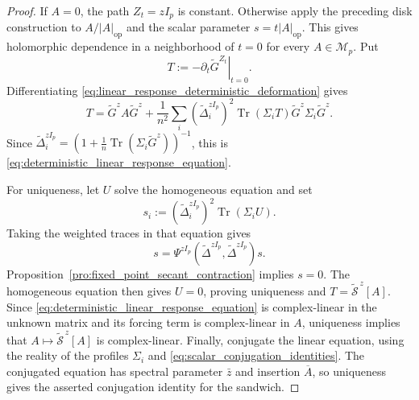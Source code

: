 \documentclass[EJP, preprint, NODS, nobera, nofontexpansion]{ejpecp}
\DeclareMathOperator{\op}{op}
\DeclareMathOperator{\tr}{Tr}
\begin{document}
\begin{proof}
If $A=0$, the path $Z_t=zI_p$ is constant. Otherwise apply the preceding
disk construction to $A/|A|_{\op}$ and the scalar parameter
$s=t|A|_{\op}$. This gives holomorphic dependence in a neighborhood of
$t=0$ for every $A\in\mathcal M_p$. Put
\[
 T:=-\left.\partial_t\widetilde G^{Z_t}\right|_{t=0}.
\]
Differentiating \eqref{eq:linear_response_deterministic_deformation}
gives
\[
 T=\tilde G^zA\tilde G^z
 +\frac1{n^2}\sum_i(\widetilde\Delta_i^{zI_p})^2
   \tr(\Sigma_iT)\tilde G^z\Sigma_i\tilde G^z.
\]
Since
$\widetilde\Delta_i^{zI_p}=(1+\frac1n\tr(\Sigma_i\tilde G^z))^{-1}$,
this is \eqref{eq:deterministic_linear_response_equation}.

For uniqueness, let $U$ solve the homogeneous equation and set
\[
 s_i:=(\widetilde\Delta_i^{zI_p})^2\tr(\Sigma_iU).
\]
Taking the weighted traces in that equation gives
\[
 s=\Psi^{zI_p}(\widetilde\Delta^{zI_p},
                 \widetilde\Delta^{zI_p})s.
\]
Proposition~\ref{pro:fixed_point_secant_contraction} implies $s=0$.
The homogeneous equation then gives $U=0$, proving uniqueness and
$T=\widetilde{\mathcal S}^{\,z}[A]$.
Since \eqref{eq:deterministic_linear_response_equation} is complex-linear in
the unknown matrix and its forcing term is complex-linear in $A$, uniqueness
implies that $A\mapsto\widetilde{\mathcal S}^{\,z}[A]$ is complex-linear.
Finally, conjugate the linear equation, using the reality of the profiles
$\Sigma_i$ and \eqref{eq:scalar_conjugation_identities}. The conjugated
equation has spectral parameter $\bar z$ and insertion $\overline A$, so
uniqueness gives the asserted conjugation identity for the sandwich.
\end{proof}
\end{document}
